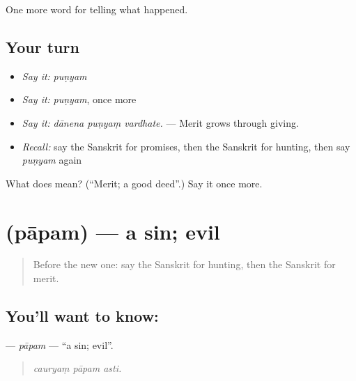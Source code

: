 \begin{grammarlens}[title={What you've built}]
One more word for telling what happened.
\end{grammarlens}

\subsection*{Your turn}
\begin{itemize}
\raggedright
  \item \emph{Say it:} \emph{puṇyam}
  \item \emph{Say it:} \emph{puṇyam}, once more
  \item \emph{Say it:} \emph{dānena puṇyaṃ vardhate.} — Merit grows through giving.
  \item \emph{Recall:} say the Sanskrit for promises, then the Sanskrit for hunting, then say \emph{puṇyam} again
\end{itemize}

\begin{tcolorbox}[breakable,colback=teal!4,colframe=teal!35!black,title={Before you move on}]
What does  mean? (\textquotedblleft{}Merit; a good deed\textquotedblright{}.) Say it once more.
\end{tcolorbox}
\section[\texorpdfstring{\sk{पापम्} (pāpam)}{पापम् (pāpam)}]{ (pāpam) — a sin; evil}

\label{lesson:SA-C338-papam}



\begin{quote}
Before the new one: say the Sanskrit for hunting, then the Sanskrit for merit.
\end{quote}

\subsection*{You'll want to know: }
\textbf{} — \emph{pāpam} — \textquotedblleft{}a sin; evil\textquotedblright{}.

\begin{quote}
  
\end{quote}

\begin{quote}
\emph{cauryaṃ pāpam asti.}
\end{quote}

